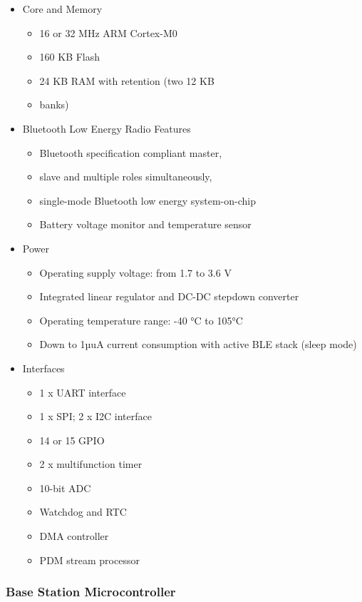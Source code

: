 \documentclass[journal,compsoc]{IEEEtran}
\begin{document}
\begin{itemize}
  \item Core and Memory
    \begin{itemize}
      \item 16 or 32 MHz ARM Cortex-M0
      \item 160 KB Flash
      \item 24 KB RAM with retention (two 12 KB
        \item banks)
    \end{itemize}
  \item Bluetooth Low Energy Radio Features
    \begin{itemize}
      \item Bluetooth specification compliant master,
      \item slave and multiple roles simultaneously,
      \item single-mode Bluetooth low energy system-on-chip
      \item Battery voltage monitor and temperature sensor
    \end{itemize}
  \item Power
    \begin{itemize}
      \item Operating supply voltage: from 1.7 to 3.6 V
      \item Integrated linear regulator and DC-DC stepdown converter
      \item Operating temperature range: -40 °C to 105°C
      \item Down to 1µuA current consumption with active BLE stack (sleep mode)
    \end{itemize}
  \item Interfaces
    \begin{itemize}
      \item 1 x UART interface
      \item 1 x SPI; 2 x I2C interface
      \item 14 or 15 GPIO
      \item 2 x multifunction timer
      \item 10-bit ADC
      \item Watchdog and RTC
      \item DMA controller
      \item PDM stream processor
    \end{itemize}
\end{itemize}

\subsubsection{Base Station Microcontroller}
\end{document}

